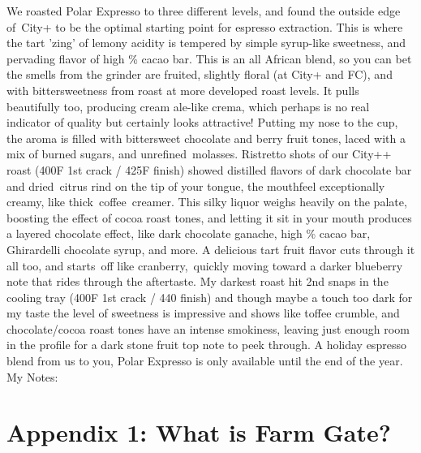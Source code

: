 \documentclass[10pt,twoside,footinclude=true,headinclude=true]{scrbook} %
\renewcommand*\raggedchapter{\centering}
\newlength{\mysize}
\newcommand{\myfontsize}[1]{
  \setlength{\mysize}{#1pt}
  \fontsize{\mysize}{1.2\mysize}
  \selectfont
}
\begin{document}
\myfontsize{7.5}
We roasted Polar Expresso to three different levels, and found the outside edge of City+ to be the optimal starting point for espresso extraction. This is where the tart 'zing' of lemony acidity is tempered by simple syrup-like sweetness, and pervading flavor of high \% cacao bar. This is an all African blend, so you can bet the smells from the grinder are fruited, slightly floral (at City+ and FC), and with bittersweetness from roast at more developed roast levels. It pulls beautifully too, producing cream ale-like crema, which perhaps is no real indicator of quality but certainly looks attractive! Putting my nose to the cup, the aroma is filled with bittersweet chocolate and berry fruit tones, laced with a mix of burned sugars, and unrefined molasses. Ristretto shots of our City++ roast (400F 1st crack / 425F finish) showed distilled flavors of dark chocolate bar and dried citrus rind on the tip of your tongue, the mouthfeel exceptionally creamy, like thick coffee creamer. This silky liquor weighs heavily on the palate, boosting the effect of cocoa roast tones, and letting it sit in your mouth produces a layered chocolate effect, like dark chocolate ganache, high \% cacao bar, Ghirardelli chocolate syrup, and more. A delicious tart fruit flavor cuts through it all too, and starts off like cranberry, quickly moving toward a darker blueberry note that rides through the aftertaste. My darkest roast hit 2nd snaps in the cooling tray (400F 1st crack / 440 finish) and though maybe a touch too dark for my taste the level of sweetness is impressive and shows like toffee crumble, and chocolate/cocoa roast tones have an intense smokiness, leaving just enough room in the profile for a dark stone fruit top note to peek through. A holiday espresso blend from us to you, Polar Expresso is only available until the end of the year. \\
\medskip
\normalsize
My Notes:


\renewcommand*\raggedchapter{\raggedright}
\linespread{1.3}

\chapter*{Appendix 1: What is Farm Gate?}
\myfontsize{8.6}
\end{document}
